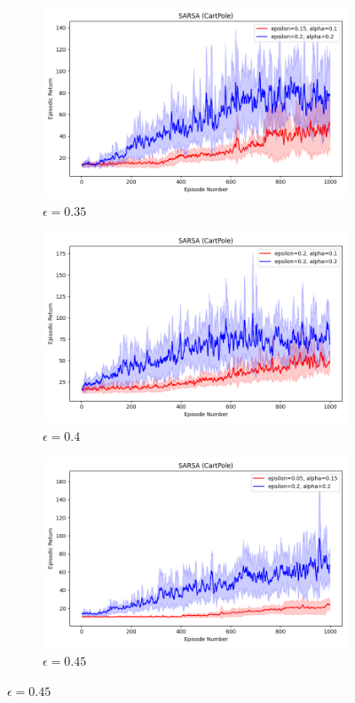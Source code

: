\documentclass[11pt, a4]{article}
\begin{document}
\begin{figure}[h]
				\vspace{0.1cm}
				
				\begin{subfigure}[h]{0.3\textwidth}
					\centering
					\includegraphics[width=\textwidth]{../plots/sarsa_0.1_0.15vs0.2_0.2.png}
					\caption{$\epsilon = 0.35$}
				\end{subfigure}
				\hfill
				\begin{subfigure}[h]{0.3\textwidth}
					\centering
					\includegraphics[width=\textwidth]{../plots/sarsa_0.1_0.2vs0.2_0.2.png}
					\caption{$\epsilon = 0.4$}
				\end{subfigure}
				\hfill
				\begin{subfigure}[h]{0.3\textwidth}
					\centering
					\includegraphics[width=\textwidth]{../plots/sarsa_0.15_0.05vs0.2_0.2.png}
					\caption{$\epsilon = 0.45$}
				\end{subfigure}
				

\end{figure}
\end{document}
